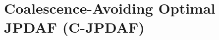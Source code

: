 \documentclass[letterpaper, paper,10pt]{AAS}		%
\newcommand{\bracket}[1]{\ensuremath{\left[ #1 \right]}}
\newcommand{\refeqn}[1]{(\ref{eqn:#1})}
\newcommand{\tr}[1]{\mathrm{tr}\ensuremath{\negthickspace\bracket{#1}}}
\newcommand{\deriv}[2]{\ensuremath{\frac{\partial #1}{\partial #2}}}
\renewcommand{\Re}{\ensuremath{\mathbb{R}}}
\begin{document}

\section{Coalescence-Avoiding Optimal JPDAF (C-JPDAF)}

%
\end{document}
